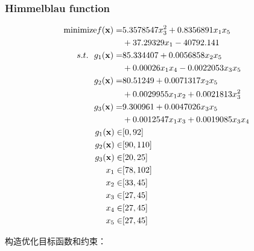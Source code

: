 \documentclass[]{ctexbook}
\begin{document}
\subsubsection{Himmelblau function}\label{BSAShim}

\begin{align}
\text{minimize} f(\mathbf{x}) =& 5.3578547x^2_3 +0.8356891x_1x_5\notag \\
&+ 37.29329x_1 - 40792.141 \notag\\
s.t. ~~g_1(\mathbf{x}) =& 85.334407 + 0.0056858x_2x_5\notag\\
&+ 0.00026x_1x_4 - 0.0022053x_3x_5  \notag\\
g_2(\mathbf{x}) =&80.51249 +0.0071317x_2x_5\notag\\
&+ 0.0029955x_1x_2 + 0.0021813x^2_3  \notag\\
g_3(\mathbf{x}) =& 9.300961 +0.0047026x_3x_5\notag\\
&+ 0.0012547x_1x_3 + 0.0019085x_3x_4 \notag\\
g_1(\mathbf{x})\in&[0,92] \notag\\
g_2(\mathbf{x})\in&[90,110] \notag\\
g_3(\mathbf{x})\in&[20,25] \notag\\
x_1\in&[78,102] \notag\\
x_2\in&[33,45] \notag\\
x_3\in&[27,45] \notag\\
x_4\in&[27,45] \notag\\
x_5\in&[27,45] \notag\\
\label{eq:him}
\end{align}

构造优化目标函数和约束：
\end{document}
